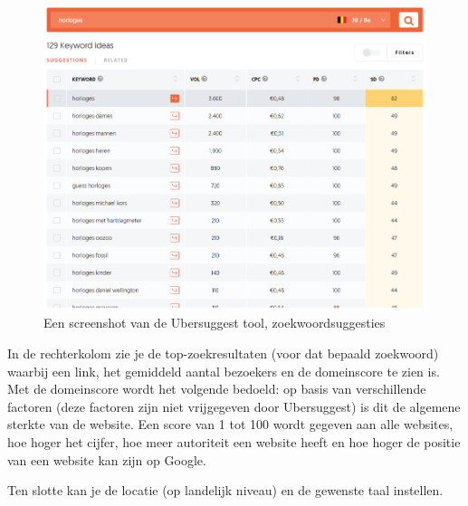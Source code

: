 \begin{figure}[h!]
\centering
\includegraphics[width=\linewidth]{Bachelorproef/bachelor/img/ubers.PNG}
\caption{Een screenshot van de Ubersuggest tool, zoekwoordsuggesties \autocite{ubersuggest}}
\end{figure}

In de rechterkolom zie je de top-zoekresultaten (voor dat bepaald zoekwoord) waarbij een link, het gemiddeld aantal bezoekers en de domeinscore te zien is. Met de domeinscore wordt het volgende bedoeld: op basis van verschillende factoren (deze factoren zijn niet vrijgegeven door Ubersuggest) is dit de algemene sterkte van de website. Een score van 1 tot 100 wordt gegeven aan alle websites, hoe hoger het cijfer, hoe meer autoriteit een website heeft en hoe hoger de positie van een website kan zijn op Google. 

Ten slotte kan je de locatie (op landelijk niveau) en de gewenste taal instellen. 

